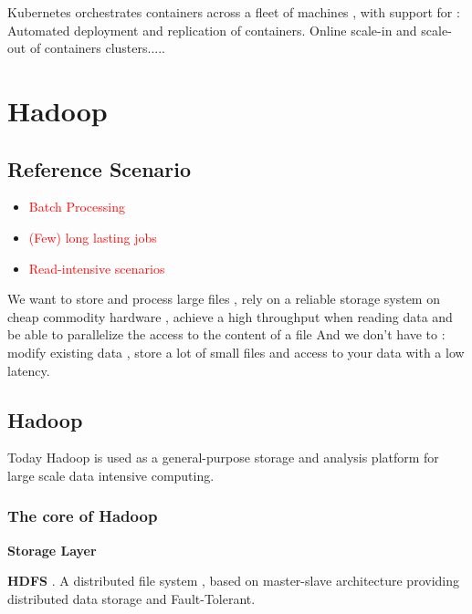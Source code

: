 \documentclass{article}
\begin{document}
Kubernetes orchestrates containers across a fleet of machines , with support for :
Automated deployment and replication of containers. Online scale-in and scale-out of containers clusters.....
\section{Hadoop}

\subsection{Reference Scenario}
\begin{itemize}
    \item \textcolor{red}{Batch Processing} 
    \item \textcolor{red}{(Few) long lasting jobs} 
    \item \textcolor{red}{Read-intensive scenarios} 
\end{itemize}

We want to store and process large files , rely on a reliable storage system on cheap commodity hardware , achieve a high throughput when reading data and be able to parallelize the access to the content of a file
And we don't have to : modify existing data , store a lot of small files and access to your data with a low latency.

\subsection{Hadoop}

Today Hadoop is used as a general-purpose storage and analysis platform for large scale data intensive computing.

\subsubsection{The core of Hadoop}

\textbf{Storage Layer}
\vspace{3mm}

\textbf{HDFS} . A distributed file system , based on master-slave architecture providing distributed data storage and Fault-Tolerant.
\end{document}
